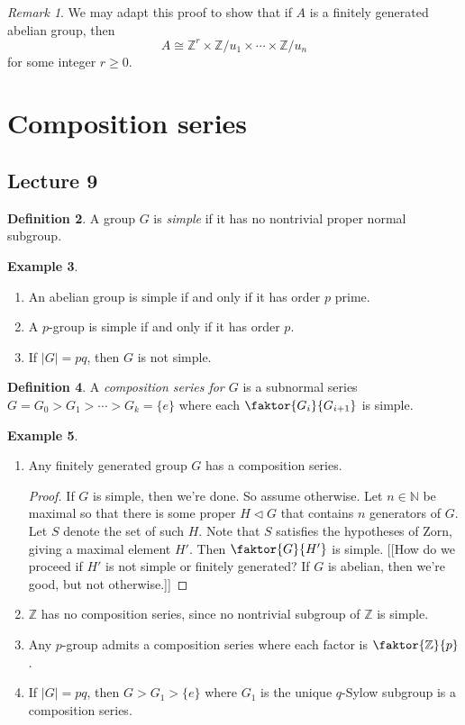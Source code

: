 \documentclass[10pt,letterpaper,cm]{nupset}
\theoremstyle{definition}
\newtheorem{definition}{Definition}[subsection]
\newtheorem{exmp}[definition]{Example}
\theoremstyle{theorem}
\theoremstyle{remark}
\newtheorem{remark}[definition]{Remark}
\newcommand{\N}{\mathbb N}
\newcommand{\Z}{\mathbb Z}
\newcommand{\1}{\mathbf{1}}
\newcommand{\0}{\vec 0}
\begin{document}
\begin{remark}
We may adapt this proof to show that if $A$ is a finitely generated abelian group, then $$A \cong \Z^r \times \Z/u_1 \times \cdots \times \Z/u_n$$ for some integer $r\geq 0$. 
\end{remark}

\section{Composition series}

\subsection{Lecture 9}

\begin{definition}
A group $G$ is \textit{simple} if it has no nontrivial proper normal subgroup.
\end{definition}

\begin{exmp} $ $
\begin{enumerate}
\item An abelian group is simple if and only if it has order $p$ prime.
\item A $p$-group is simple if and only if it has order $p$.
\item If $|G| = pq$, then $G$ is not simple.
\end{enumerate}
\end{exmp}

\begin{definition}
A \textit{composition series for $G$} is a subnormal series $G = G_0 > G_1 > \cdots > G_k = \{e\}$ where each $\faktor{G_i}{G_{i+1}}$ is simple.
\end{definition}

\begin{exmp} $ $
\begin{enumerate}
\item Any finitely generated group $G$ has a composition series.
\begin{proof}
If $G$ is simple, then we're done. So assume otherwise. Let $n\in \N$ be maximal so that there is some proper $H \lhd G$ that contains $n$ generators of $G$. Let $S$ denote the set of such $H$. Note that $S$ satisfies the hypotheses of Zorn, giving a maximal element $H'$. Then $\faktor{G}{H'}$ is simple. {[[How do we proceed if $H'$ is not simple or finitely generated? If $G$ is abelian, then we're good, but not otherwise.]]}
\end{proof}
\item $\Z$ has no composition series, since no nontrivial subgroup of $\Z$ is simple.
\item Any $p$-group admits a composition series where each factor is $\faktor{\Z}{p}$.
\item If $|G|= pq$, then $G > G_1 > \{e\}$ where $G_1$ is the unique $q$-Sylow subgroup is a composition series.
\end{enumerate}
\end{exmp}
\end{document}
